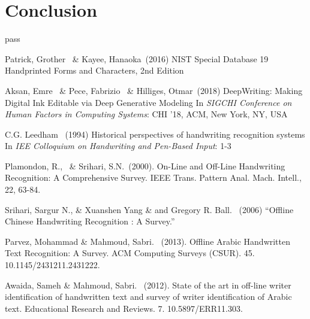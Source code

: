 \documentclass{article}
\begin{document}
\section{Conclusion}
pass 

\small

\begin{thebibliography}{99} 
   Patrick, Grother \ \&  Kayee, Hanaoka\ (2016) NIST Special Database 19 Handprinted Forms and Characters, 2nd Edition
  
   Aksan, Emre \ \& Pece, Fabrizio \ \& Hilliges, Otmar\ (2018) DeepWriting: Making Digital Ink Editable via Deep Generative Modeling
  In {\itshape SIGCHI Conference on Human Factors in Computing Systems}: CHI '18, ACM, New York, NY, USA
  
   C.G. Leedham \ (1994) Historical perspectives of handwriting recognition systems 
  In {\itshape IEE Colloquium on Handwriting and Pen-Based Input}: 1-3
  
   Plamondon, R., \ \& Srihari, S.N.\ (2000). 
  On-Line and Off-Line Handwriting Recognition: A Comprehensive Survey. IEEE Trans. Pattern Anal. Mach. Intell., 22, 63-84.

   Srihari, Sargur N., \& Xuanshen Yang \& and Gregory R. Ball. \ (2006) “Offline Chinese Handwriting Recognition : A Survey.”

   Parvez, Mohammad \&  Mahmoud, Sabri. \ (2013). Offline Arabic Handwritten Text Recognition: A Survey. ACM Computing Surveys (CSUR). 45. 10.1145/2431211.2431222. 

   Awaida, Sameh \& Mahmoud, Sabri. \ (2012). State of the art in off-line writer identification of handwritten text and survey of writer identification of Arabic text. Educational Research and Reviews. 7. 10.5897/ERR11.303. 


\end{thebibliography}
\end{document}
